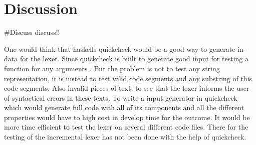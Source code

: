 \chapter{Discussion}
\#Discuss discuss!!

One would think that haskells quickcheck would be a good way to generate in-data
for the lexer. Since quickcheck is built to generate good input for testing a
function for any arguments \cite{QuickCheck}. But the problem is not to test any
string representation, it is instead to test valid code segments and any
substring of this code segments. Also invalid pieces of text, to see that the
lexer informs the user of syntactical errors in these texts. To write a input
generator in quickcheck which would generate full code with all of its
components and all the different properties would have to high cost in
develop time for the outcome. It would be more time efficient to test the lexer
on several different code files. There for the testing of the incremental lexer
has not been done with the help of quickcheck.
